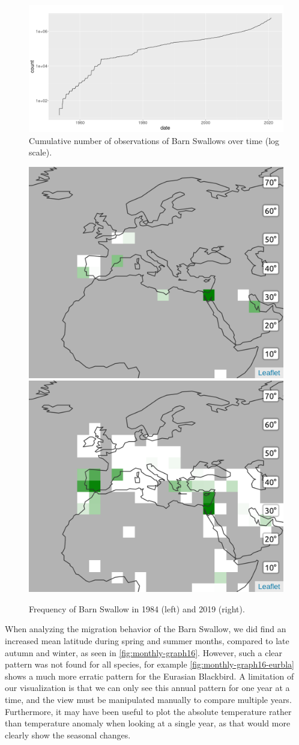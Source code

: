 \documentclass[journal]{vgtc}                %
\begin{document}
\begin{figure}[t]
  \centering
  \includegraphics[width=\linewidth]{observations-over-time}
  \caption{Cumulative number of observations of Barn Swallows over time (log scale).}
  \label{fig:observations-over-time}
\end{figure}

\begin{figure}[t]
  \centering
    \includegraphics[width=0.48\linewidth]{bird-map-barswa-1984-03.png}
    \hfill
    \includegraphics[width=0.48\linewidth]{bird-map-barswa-2019-03.png}
    \caption{Frequency of Barn Swallow in 1984 (left) and 2019 (right).}
    \label{fig:birds-comparison}
\end{figure}

When analyzing the migration behavior of the Barn Swallow, we did find an increased mean latitude during spring and summer months, compared to late autumn and winter, as seen in \autoref{fig:monthly-graph16}. However, such a clear pattern was not found for all species, for example \autoref{fig:monthly-graph16-eurbla} shows a much more erratic pattern for the Eurasian Blackbird. A limitation of our visualization is that we can only see this annual pattern for one year at a time, and the view must be manipulated manually to compare multiple years. Furthermore, it may have been useful to plot the absolute temperature rather than temperature anomaly when looking at a single year, as that would more clearly show the seasonal changes.
\end{document}
